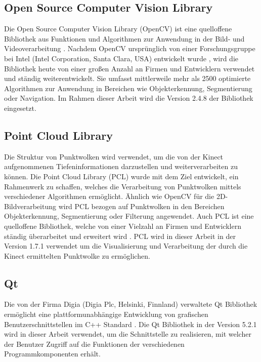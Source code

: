 
\prever{
}

\subsection{Open Source Computer Vision Library}
Die Open Source Computer Vision Library (OpenCV) ist eine quelloffene Bibliothek aus Funktionen und Algorithmen zur Anwendung in der Bild- und Videoverarbeitung \cite{OpenCV}. Nachdem OpenCV ursprünglich von einer Forschungsgruppe bei Intel (Intel Corporation, Santa Clara, USA) entwickelt wurde \cite{Laganiere2011}, wird die Bibliothek heute von einer großen Anzahl an Firmen und Entwicklern verwendet und ständig weiterentwickelt. Sie umfasst mittlerweile mehr als \SI{2500}{} optimierte Algorithmen zur Anwendung in Bereichen wie Objekterkennung, Segmentierung oder Navigation. Im Rahmen dieser Arbeit wird die Version 2.4.8 der Bibliothek eingesetzt.


\subsection{Point Cloud Library}
Die Struktur von Punktwolken wird verwendet, um die von der Kinect aufgenommenen Tiefeninformationen darzustellen und weiterverarbeiten zu können. Die Point Cloud Library (PCL) wurde mit dem Ziel entwickelt, ein Rahmenwerk zu schaffen, welches die Verarbeitung von Punktwolken mittels verschiedener Algorithmen ermöglicht. Ähnlich wie OpenCV für die 2D-Bildverarbeitung wird PCL bezogen auf Punktwolken in den Bereichen Objekterkennung, Segmentierung oder Filterung angewendet. Auch PCL ist eine quelloffene Bibliothek, welche von einer Vielzahl an Firmen und Entwicklern ständig überarbeitet und erweitert wird \cite{PCL}. PCL wird in dieser Arbeit in der Version 1.7.1 verwendet um die Visualisierung und Verarbeitung der durch die Kinect ermittelten Punktwolke zu ermöglichen.


\subsection{Qt}
Die von der Firma Digia (Digia Plc, Helsinki, Finnland) verwaltete Qt Bibliothek ermöglicht eine plattformunabhängige Entwicklung von grafischen Benutzerschnittstellen im C++ Standard \cite{Qt}. Die Qt Bibliothek in der Version 5.2.1 wird in dieser Arbeit verwendet, um die Schnittstelle zu realisieren, mit welcher der Benutzer Zugriff auf die Funktionen der verschiedenen Programmkomponenten erhält.

